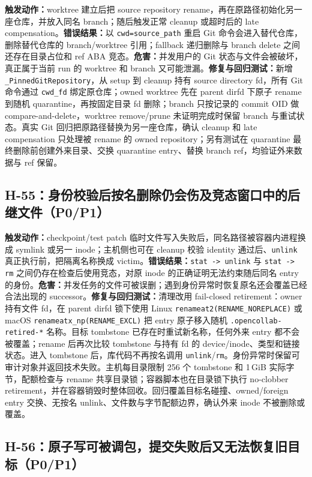\documentclass[11pt,a4paper,fontset=fandol]{ctexart}
\newcommand{\code}[1]{\texttt{#1}}
\begin{document}
\textbf{触发动作：}worktree 建立后把 source repository rename，再在原路径初始化另一座仓库，并放入同名 branch；随后触发正常 cleanup 或超时后的 late compensation。\textbf{错误结果：}以 \code{cwd=source\_path} 重启 Git 命令会进入替代仓库，删除替代仓库的 branch/worktree 引用；fallback 递归删除与 branch delete 之间还存在目录占位和 ref ABA 竞态。\textbf{危害：}并发用户的 Git 状态与文件会被破坏，真正属于当前 run 的 worktree 和 branch 又可能泄漏。\textbf{修复与回归测试：}新增 \code{\_PinnedGitRepository}，从 setup 到 cleanup 持有 source directory fd，所有 Git 命令通过 \code{cwd\_fd} 绑定原仓库；owned worktree 先在 parent dirfd 下原子 rename 到随机 quarantine，再按固定目录 fd 删除；branch 只按记录的 commit OID 做 compare-and-delete，worktree remove/prune 未证明完成时保留 branch 与重试状态。真实 Git 回归把原路径替换为另一座仓库，确认 cleanup 和 late compensation 只处理被 rename 的 owned repository；另有测试在 quarantine 最终删除前创建外来目录、交换 quarantine entry、替换 branch ref，均验证外来数据与 ref 保留。

\subsection{H-55：身份校验后按名删除仍会伤及竞态窗口中的后继文件（P0/P1）}

\textbf{触发动作：}checkpoint/test patch 临时文件写入失败后，同名路径被容器内进程换成 symlink 或另一 inode；主机侧也可在 cleanup 校验 identity 通过后、\code{unlink} 真正执行前，把隔离名称换成 victim。\textbf{错误结果：}\code{stat -> unlink} 与 \code{stat -> rm} 之间仍存在检查后使用竞态，对原 inode 的正确证明无法约束随后同名 entry 的身份。\textbf{危害：}并发任务的文件可被误删；遇到身份异常时恢复原名还会覆盖已经合法出现的 successor。\textbf{修复与回归测试：}清理改用 fail-closed retirement：owner 持有文件 fd，在 parent dirfd 锁下使用 Linux \code{renameat2(RENAME\_NOREPLACE)} 或 macOS \code{renameatx\_np(RENAME\_EXCL)} 把 entry 原子移入随机 \code{.opencollab-retired-*} 名称。目标 tombstone 已存在时重试新名称，任何外来 entry 都不会被覆盖；rename 后再次比较 tombstone 与持有 fd 的 device/inode、类型和链接状态。进入 tombstone 后，库代码不再按名调用 \code{unlink}/\code{rm}。身份异常时保留可审计对象并返回技术失败。主机每目录限制 256 个 tombstone 和 1\,GiB 实际字节，配额检查与 rename 共享目录锁；容器脚本也在目录锁下执行 no-clobber retirement，并在容器销毁时整体回收。回归覆盖目标名碰撞、owned/foreign entry 交换、无按名 unlink、文件数与字节配额边界，确认外来 inode 不被删除或覆盖。

\subsection{H-56：原子写可被调包，提交失败后又无法恢复旧目标（P0/P1）}
\end{document}
